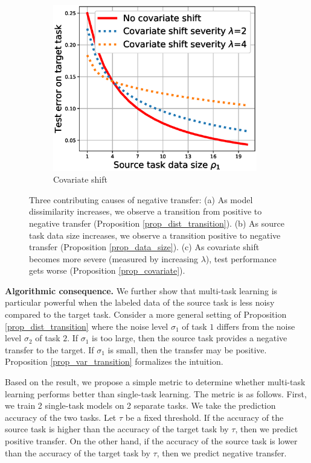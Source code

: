 \begin{figure}
\begin{subfigure}[b]{0.32\textwidth}
		\centering
		\includegraphics[width=0.98\textwidth]{figures/complementary.eps}
		\caption{Covariate shift}
		\label{fig_covariate}
	\end{subfigure}
	\caption{Three contributing causes of negative transfer:
	(a) As model dissimilarity increases, we observe a transition from positive to negative transfer  (Proposition \ref{prop_dist_transition}).
	(b) As source task data size increases, we observe a transition positive to negative transfer (Proposition \ref{prop_data_size}).
	(c) As covariate shift becomes more severe (measured by increasing $\lambda$), test performance gets worse (Proposition \ref{prop_covariate}).}
	\label{fig_model_shift_phasetrans}
\end{figure}

\textbf{Algorithmic consequence.}
We further show that multi-task learning is particular powerful when the labeled data of the source task is less noisy compared to the target task.
Consider a more general setting of Proposition \ref{prop_dist_transition} where the noise level $\sigma_1$ of task $1$ differs from the noise level $\sigma_2$ of task $2$.
If $\sigma_1$ is too large, then the source task provides a negative transfer to the target.
If $\sigma_1$ is small, then the transfer may be positive.
Proposition \ref{prop_var_transition} formalizes the intuition.

Based on the result, we propose a simple metric to determine whether multi-task learning performs better than single-task learning.
The metric is as follows.
First, we train 2 single-task models on 2 separate tasks.
We take the prediction accuracy of the two tasks.
Let $\tau$ be a fixed threshold.
If the accuracy of the source task is higher than the accuracy of the target task by $\tau$, then we predict positive transfer.
On the other hand, if the accuracy of the source task is lower than the accuracy of the target task by $\tau$, then we predict negative transfer.

